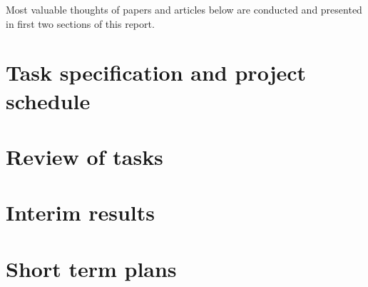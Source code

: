 \documentclass[12pt,a4paper]{report}
\begin{document}
Most valuable thoughts of papers and articles below are conducted and presented in first two
sections of this report.

\section*{Task specification and project schedule}
\section*{Review of tasks}
\section*{Interim results}
\section*{Short term plans}
\end{document}
